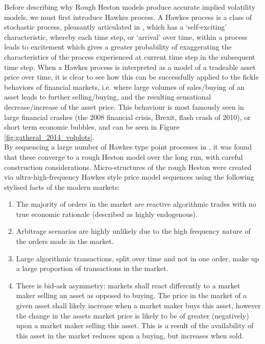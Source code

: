 \documentclass[12pt,oneside]{article}
\begin{document}
Before describing why Rough Heston models produce accurate implied volatility models, we must first introduce Hawkes process. A Hawkes process is a class of stochastic process, pleasantly articulated in \cite{Laub2015}, which has a `self-exciting' characteristic, whereby each time step, or `arrival' over time, within a process leads to excitement which gives a greater probability of exaggerating the characteristics of the process experienced at current time step in the subsequent time step. When a Hawkes process is interpreted as a model of a tradeable asset price over time, it is clear to see how this can be successfully applied to the fickle behaviors of financial markets, i.e. where large volumes of sales/buying of an asset leads to further selling/buying, and the resulting sensational decrease/increase of the asset price. This behaviour is most famously seen in large financial crashes (the 2008 financial crisis, Brexit, flash crash of 2010), or short term economic bubbles, and can be seen in Figure \ref{fig:gatheral_2014_volplots}. 
\\

By sequencing a large number of Hawkes type point processes in \cite{Omar2016}, it was found that these converge to a rough Heston model over the long run, with careful construction considerations. Micro-structures of the rough Heston were created via ultra-high-frequency Hawkes style price model sequences using the following stylised facts of the modern markets: 

\begin{enumerate} 
\item The majority of orders in the market are reactive algorithmic trades with no true economic rationale (described as highly endogenous). 
\item Arbitrage scenarios are highly unlikely due to the high frequency nature of the orders made in the market.  
\item Large algorithmic transactions, split over time and not in one order, make up a large proportion of transactions in the market.
\item There is bid-ask asymmetry: markets shall react differently to a market maker selling an asset as opposed to buying. The price in the market of a given asset shall likely increase when a market maker buys this asset, however the change in the assets market price is likely to be of greater (negatively) upon a market maker selling this asset. This is a result of the availability of this asset in the market reduces upon a buying, but increases when sold.  
\end{enumerate}
\end{document}
